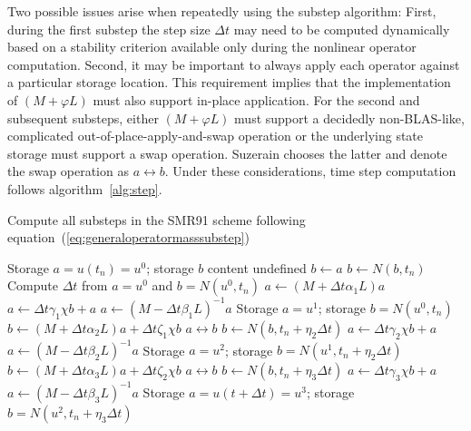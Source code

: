 \documentclass[letterpaper,11pt,nointlimits,reqno,draft]{amsbook}
\begin{document}
Two possible issues arise when repeatedly using the substep algorithm: First,
during the first substep the step size $\Delta{}t$ may need to be computed
dynamically based on a stability criterion available only during the nonlinear
operator computation.  Second, it may be important to always apply each
operator against a particular storage location.  This requirement implies that
the implementation of $\left(M+\varphi{}L\right)$ must also support in-place
application.  For the second and subsequent substeps, either
$\left(M+\varphi{}L\right)$ must support a decidedly non-BLAS-like, complicated
out-of-place-apply-and-swap operation or the underlying state storage must
support a swap operation.  Suzerain chooses the latter and denote the swap operation
as $a\leftrightarrow{}b$.  Under these considerations, time step computation
follows algorithm~\vref{alg:step}.

\begin{algorithm}
\caption{Compute all substeps in the SMR91 scheme following
         equation~(\ref{eq:generaloperatormasssubstep})
         }
\label{alg:step}
\begin{algorithmic}
  \renewcommand{\algorithmiccomment}[1]{\hfill{}// #1}
  \REQUIRE Storage $a = u\left(t_{n}\right) = u^{0} $;
           storage $b$ content undefined
  \STATE $b\leftarrow{}a$
  \STATE $b\leftarrow{}N\left(b,t_{n}\right)$
  \STATE Compute $\Delta{}t$ from $a=u^0$ and $b=N\left(u^0,t_{n}\right)$
  \STATE $a\leftarrow{}\left(M+\Delta{}t\alpha_{1}L\right)a$
  \STATE $a\leftarrow{}\Delta{}t \gamma_{1} \chi{} b + a$
  \STATE $a\leftarrow{}\left(M-\Delta{}t\beta_{1}L\right)^{-1}a$
  \ENSURE Storage $a = u^1$;
          storage $b = N\left(u^{0},t_{n}\right)$
  \STATE $b\leftarrow{}   \left(M+\Delta{}t\alpha_{2}L\right)a
                        + \Delta{}t\zeta_{1}\chi{}b$
  \STATE $a\leftrightarrow{}b$
  \STATE $b\leftarrow{}N\left(b,t_{n}+\eta_{2}\Delta{}t\right)$
  \STATE $a\leftarrow{}\Delta{}t \gamma_{2} \chi{} b + a$
  \STATE $a\leftarrow{}\left(M-\Delta{}t\beta_{2}L\right)^{-1}a$
  \ENSURE Storage $a = u^{2}$;
          storage $b = N\left(u^{1},t_{n}+\eta_{2}\Delta{}t\right)$
  \STATE $b\leftarrow{}   \left(M+\Delta{}t\alpha_{3}L\right)a
                        + \Delta{}t\zeta_{2}\chi{}b$
  \STATE $a\leftrightarrow{}b$
  \STATE $b\leftarrow{}N\left(b,t_{n}+\eta_{3}\Delta{}t\right)$
  \STATE $a\leftarrow{}\Delta{}t \gamma_{3} \chi{}b + a$
  \STATE $a\leftarrow{}\left(M-\Delta{}t\beta_{3}L\right)^{-1}a$
  \ENSURE Storage $a = u\left(t+\Delta{}t\right)= u^{3}$;
          storage $b = N\left(u^{2},t_{n}+\eta_{3}\Delta{}t\right)$
\end{algorithmic}
\end{algorithm}
\end{document}
